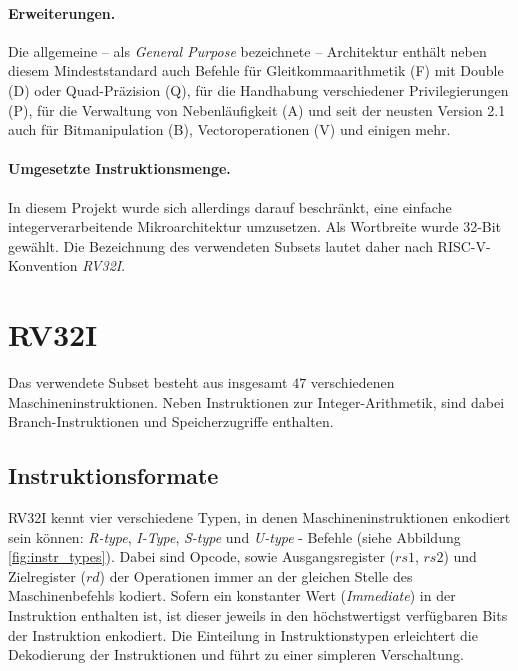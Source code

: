 \paragraph{Erweiterungen.} Die allgemeine -- als \textit{General
Purpose} bezeichnete -- Architektur enthält neben diesem Mindeststandard auch Befehle für Gleitkommaarithmetik (F) mit Double (D) oder Quad-Präzision (Q), für die Handhabung verschiedener Privilegierungen (P), für die Verwaltung von Nebenläufigkeit (A) und seit der neusten Version 2.1 auch für Bitmanipulation (B), Vectoroperationen (V) und einigen mehr. \cite[p. 4f.]{RISC}

\paragraph{Umgesetzte Instruktionsmenge.} In diesem Projekt wurde sich
allerdings darauf beschränkt, eine einfache integerverarbeitende
Mikroarchitektur umzusetzen. Als Wortbreite wurde 32-Bit gewählt. Die Bezeichnung des verwendeten Subsets lautet daher nach RISC-V-Konvention \textit{RV32I}. \cite[p. 67ff.]{RISC}

\section{RV32I}
Das verwendete Subset besteht aus insgesamt $47$ verschiedenen
Maschineninstruktionen. Neben Instruktionen zur Integer-Arithmetik, sind dabei Branch-Instruktionen und Speicherzugriffe enthalten.

\subsection{Instruktionsformate}
RV32I kennt vier verschiedene Typen, in denen Maschineninstruktionen
enkodiert sein können: \textit{R-type}, \textit{I-Type}, \textit{S-type}
und \textit{U-type} - Befehle (siehe Abbildung \ref{fig:instr_types}).
Dabei sind Opcode, sowie Ausgangsregister ($rs1$, $rs2$) und
Zielregister ($rd$) der Operationen immer an der gleichen Stelle des
Maschinenbefehls kodiert. Sofern ein konstanter Wert (\emph{Immediate})
in der Instruktion enthalten ist, ist dieser jeweils in den
höchstwertigst verfügbaren Bits der Instruktion enkodiert. Die Einteilung in 
Instruktionstypen erleichtert die Dekodierung der Instruktionen und führt zu einer simpleren Verschaltung.

